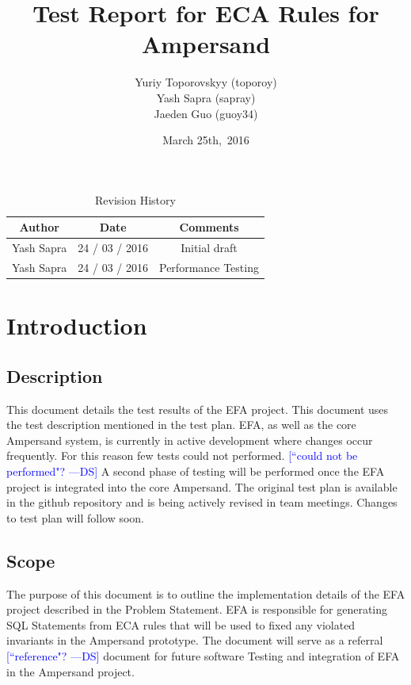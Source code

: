 \documentclass[12pt, svgnames]{article}
\newcommand{\authornote}[3]{\textcolor{#1}{[#3 ---#2]}}
\newcommand{\authornote}[3]{}
\newcommand{\ds}[1]{\authornote{blue}{DS}{#1}}
\begin{document}
\title{\vspace*{3cm} Test Report for ECA Rules for Ampersand} 
\author{Yuriy Toporovskyy (toporoy)\\ Yash Sapra (sapray) \\ Jaeden Guo (guoy34)}
\date{March 25th,\ 2016} 

\maketitle
\newpage
\vspace*{1cm}
\begin{table}[ht!]\begin{center}
        \caption{Revision History}  
        \begin{tabular}{|c|c|c|}\hline
            \textbf{Author} & \textbf{Date} & \textbf{Comments} \\\hline 
            Yash Sapra & 24 / 03 / 2016 & Initial draft\\\hline
	    Yash Sapra & 24 / 03 / 2016 & Performance Testing\\\hline
        \end{tabular}
    \end{center}\end{table}
\newpage

\tableofcontents

\newpage

\section{Introduction}\label{intro}

\subsection{Description}

This document details the test results of the EFA project.
This document uses the test description mentioned in the test plan.
EFA, as well as the core Ampersand system, is
currently in active development where changes occur frequently.
For this reason few tests could not performed. 
\ds{``could not be performed"?}
A second phase of testing will be performed 
once the EFA project is integrated into the core Ampersand. The original test plan is available in the github repository and is being actively revised in team meetings. Changes to test plan will follow soon.

\subsection{Scope}
The purpose of this document is to outline the implementation details of the 
EFA project described in the Problem Statement.
EFA is responsible for generating SQL Statements from ECA rules that will 
be used to fixed any violated invariants in the Ampersand prototype. 
The document will serve as a referral
\ds{``reference"?}
document for future software Testing and integration of EFA in the Ampersand project.
\end{document}
